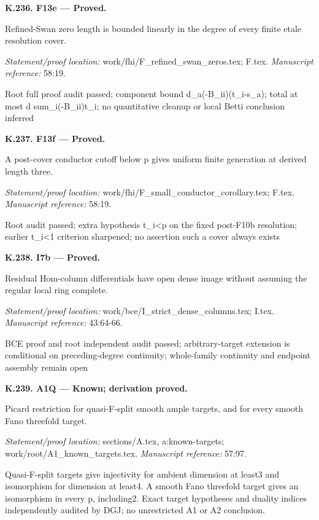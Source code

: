 \par\medskip\noindent\textbf{K.236. F13e --- Proved.}\par
Refined-Swan zero length is bounded linearly in the degree of every finite etale resolution cover.
\par\emph{Statement/proof location:} work/fhi/F\_refined\_swan\_zeros.tex; F.tex.
\emph{Manuscript reference:} 58:19.
\par Root full proof audit passed; component bound d\_a(-B\_ii)(t\_i-s\_a); total at most d sum\_i(-B\_ii)t\_i; no quantitative cleanup or local Betti conclusion inferred
\par\medskip\noindent\textbf{K.237. F13f --- Proved.}\par
A post-cover conductor cutoff below p gives uniform finite generation at derived length three.
\par\emph{Statement/proof location:} work/fhi/F\_small\_conductor\_corollary.tex; F.tex.
\emph{Manuscript reference:} 58:19.
\par Root audit passed; extra hypothesis t\_i<p on the fixed post-F10b resolution; earlier t\_i<1 criterion sharpened; no assertion such a cover always exists
\par\medskip\noindent\textbf{K.238. I7b --- Proved.}\par
Residual Hom-column differentials have open dense image without assuming the regular local ring complete.
\par\emph{Statement/proof location:} work/bce/I\_strict\_dense\_columns.tex; I.tex.
\emph{Manuscript reference:} 43:64-66.
\par BCE proof and root independent audit passed; arbitrary-target extension is conditional on preceding-degree continuity; whole-family continuity and endpoint assembly remain open
\par\medskip\noindent\textbf{K.239. A1Q --- Known; derivation proved.}\par
Picard restriction for quasi-F-split smooth ample targets, and for every smooth Fano threefold target.
\par\emph{Statement/proof location:} sections/A.tex, a:known-targets; work/root/A1\_known\_targets.tex.
\emph{Manuscript reference:} 57:97.
\par Quasi-F-split targets give injectivity for ambient dimension at least3 and isomorphism for dimension at least4. A smooth Fano threefold target gives an isomorphism in every p, including2. Exact target hypotheses and duality indices independently audited by DGJ; no unrestricted A1 or A2 conclusion.
